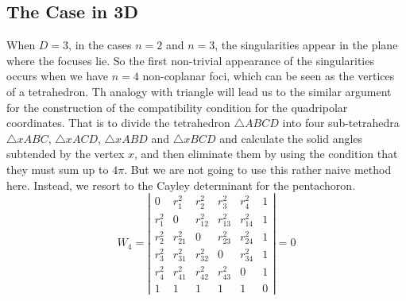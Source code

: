 \documentclass{article}
\begin{document}
\subsection{The Case in 3D}
\label{sec:org60cc959}
 When \(D=3\), in the cases \(n=2\) and \(n=3\), the singularities appear in the plane where the focuses lie. 
So the first non-trivial appearance of the singularities occurs when we have \(n=4\) non-coplanar foci, which can be seen as the vertices of a tetrahedron. 
Th analogy with triangle will lead us to the similar argument for the construction of the compatibility condition for the quadripolar coordinates. 
That is to divide the tetrahedron \(\triangle ABCD\) into four sub-tetrahedra \(\triangle xABC\), \(\triangle xACD\), \(\triangle xABD\) and \(\triangle xBCD\) and calculate the solid angles subtended by the vertex \(x\), and then eliminate them by using the condition that they must sum up to \(4\pi\). 
But we are not going to use this rather naive method here. Instead, we resort to the Cayley determinant for the pentachoron.
\begin{equation}
\label{eq:vol_det}
W_4=
\left|\begin{array}{cccccc}
0 & r_{1}^2 & r_{2}^2 & r_{3}^2 & r_{4}^2 & 1 \\
r_{1}^2 & 0 & r_{12}^2 & r_{13}^2 & r_{14}^2 & 1 \\
r_{2}^2 & r_{21}^2 & 0 & r_{23}^2 & r_{24}^2 & 1 \\
r_{3}^2 & r_{31}^2 & r_{32}^2 & 0 & r_{34}^2 & 1 \\
r_{4}^2 & r_{41}^2 & r_{42}^2 & r_{43}^2 & 0 & 1 \\
1 & 1 & 1 & 1 & 1 & 0  
\end{array}\right|
=0
\end{equation}
\end{document}
